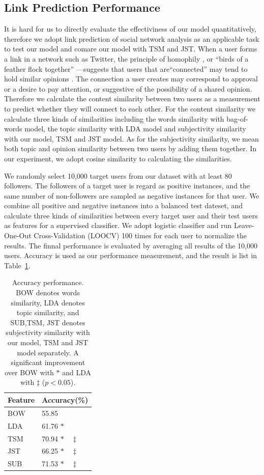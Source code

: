 \documentclass[runningheads,a4paper]{llncs}
\begin{document}
\subsection{Link Prediction Performance}
It is hard for us to directly evaluate the effectiviness of our model quantitatively, therefore we adopt link prediction of social network analysis as an applicable task to test our model and comare our model with TSM and JST. When a user forms a link in a network such as Twitter, the principle of homophily \cite{lazarsfeld_friendship_1954}, or ``birds of a feather flock together'' \cite{mcpherson2001birds} —suggests that users that are``connected'' may tend to hold similar opinions \cite{thelwall2010emotion}. The connection a user creates may correspond to approval or a desire to pay attention, or suggestive of the possibility of a shared opinion. Therefore we calculate the content similarity between two users as a measurement to predict whether they will connect to each other. For the content similarity we calculate three kinds of similarities including the words similarity with bag-of-words model, the topic similarity with LDA model and subjectivity similarity with our model, TSM and JST model. As for the subjectivity similarity, we mean both topic and opinion similarity between two users by adding them together. In our experiment, we adopt cosine similarity to calculating the similarities.

We randomly select 10,000 target users from our dataset with at least 80 followers. The followers of a target user is regard as positive instances, and the same number of non-followers are sampled as negative instances for that user. We combine all positive and negative instances into a balanced test dateset, and calculate three kinds of similarities between every target user and their test users as features for a supervised classifier. We adopt logistic classifier and run Leave-One-Out Cross-Validation (LOOCV) 100 times for each user to normalize the results. The finnal performance is evaluated by averaging all results of the 10,000 users. Accuracy is used as our performance measurement, and the result is list in Table~\ref{tab2}.
\begin{table}[htb]
\centering
\caption{Accuracy performance. BOW denotes words similarity, LDA denotes topic similarity, and SUB,TSM, JST denotes subjectivity similarity with our model, TSM and JST model separately. A significant improvement over BOW with $ \ast $ and LDA with $ \ddagger $ ($p < 0.05$).}
\label{tab2}
\begin{tabular}{|l|l|}
\hline
Feature & Accuracy(\%)\\
\hline
BOW & 55.85  \\
LDA & 61.76 $ \ast  $\\
TSM & 70.94  $ \ast \quad \ddagger $\\
JST & 66.25 $ \ast \quad \ddagger $\\
SUB & 71.53 $ \ast \quad \ddagger $\\
\hline
\end{tabular}
\end{table}
\end{document}
